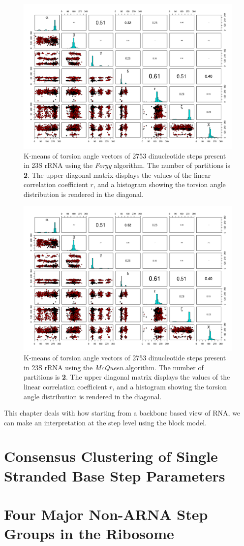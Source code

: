 \begin{figure}[htbp]
\centering
\includegraphics[angle=90, scale=0.50]{forgy_tor_b.png}
\caption{
K-means of torsion  angle vectors of 2753 dinucleotide steps
present in  23S rRNA using the  \textit{Forgy} algorithm.  The
number  of  partitions  is  \textbf{2}.   The  upper  diagonal  matrix
displays the values  of the linear correlation coefficient  $r$, and a
histogram showing  the torsion angle  distribution is rendered  in the
diagonal.}
\end{figure}

\begin{figure}[htbp]
\centering
\includegraphics[angle=90, scale=0.50]{macqueen_tor_b.png}
\caption{
K-means of torsion  angle vectors of 2753 dinucleotide steps
present in  23S rRNA using the  \textit{McQueen} algorithm.  The
number  of  partitions  is  \textbf{2}.   The  upper  diagonal  matrix
displays the values  of the linear correlation coefficient  $r$, and a
histogram showing  the torsion angle  distribution is rendered  in the
diagonal.}
\label{fig:macqueen}
\end{figure}




This chapter deals with how starting from a backbone based view of
RNA, we can make an interpretation at the step level using the block model.
\section{Consensus Clustering of Single Stranded Base Step Parameters}

\section{Four Major Non-ARNA Step Groups in the Ribosome}



